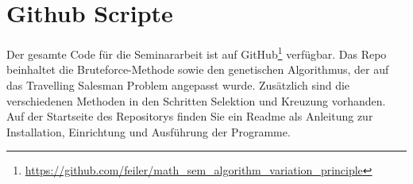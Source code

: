 %
%
%
%
\section{Github Scripte
\label{buch:paper:varalg:section:github_scripte}}

Der gesamte Code für die Seminararbeit ist auf GitHub\footnote{
    \url{https://github.com/feiler/math_sem_algorithm_variation_principle}
    }
\cite{algorythm:repo} verfügbar. Das Repo beinhaltet die Bruteforce-Methode sowie
den genetischen Algorithmus, der auf das Travelling Salesman Problem angepasst wurde. Zusätzlich
sind die verschiedenen Methoden in den Schritten Selektion und Kreuzung vorhanden.
Auf der Startseite des Repositorys finden Sie ein Readme als Anleitung zur 
Installation, Einrichtung und Ausführung der Programme.
